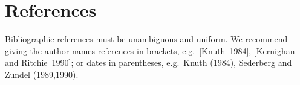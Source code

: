 \section{References}
Bibliographic references must be unambiguous and uniform.  We
recommend giving the author names references in brackets,
e.g.~[Knuth~1984], [Kernighan and Ritchie~1990]; or dates in
parentheses, e.g.~Knuth (1984), Sederberg and Zundel (1989,1990).



